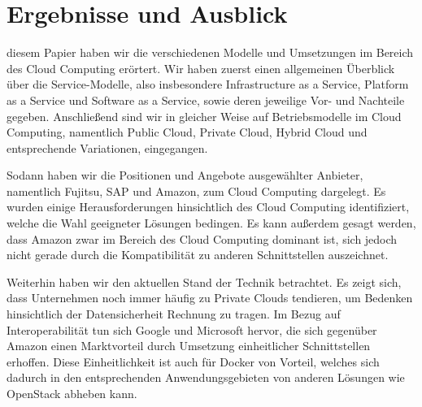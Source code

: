 \section{Ergebnisse und Ausblick}
\label{sec_conclusion}

 diesem Papier haben wir die verschiedenen Modelle und Umsetzungen im Bereich des Cloud Computing erörtert. 
Wir haben zuerst einen allgemeinen Überblick über die Service-Modelle, also insbesondere Infrastructure as a Service, Platform as a Service und Software as a Service, sowie deren jeweilige Vor- und Nachteile gegeben. 
Anschließend sind wir in gleicher Weise auf Betriebsmodelle im Cloud Computing, namentlich Public Cloud, Private Cloud, Hybrid Cloud und entsprechende Variationen, eingegangen. 


Sodann haben wir die Positionen und Angebote ausgewählter Anbieter, namentlich Fujitsu, SAP und Amazon, zum Cloud Computing dargelegt. 
Es wurden einige Herausforderungen hinsichtlich des Cloud Computing identifiziert, welche die Wahl geeigneter Lösungen bedingen. 
Es kann außerdem gesagt werden, dass Amazon zwar im Bereich des Cloud Computing dominant ist, sich jedoch nicht gerade durch die Kompatibilität zu anderen Schnittstellen auszeichnet.


Weiterhin haben wir den aktuellen Stand der Technik betrachtet.
Es zeigt sich, dass Unternehmen noch immer häufig zu Private Clouds tendieren, um Bedenken hinsichtlich der Datensicherheit Rechnung zu tragen. 
Im Bezug auf Interoperabilität tun sich Google und Microsoft hervor, die sich gegenüber Amazon einen Marktvorteil durch Umsetzung einheitlicher Schnittstellen erhoffen. 
Diese Einheitlichkeit ist auch für Docker von Vorteil, welches sich dadurch in den entsprechenden Anwendungsgebieten von anderen Lösungen wie OpenStack abheben kann. 


